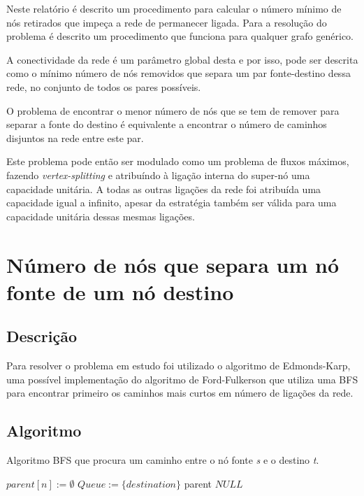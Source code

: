 \documentclass[12pt,a4paper]{scrartcl}
\begin{document}
Neste relatório é descrito um procedimento para calcular o número mínimo de nós retirados que impeça a rede de permanecer ligada. Para a resolução do problema é descrito um procedimento que funciona para qualquer grafo genérico.

A conectividade da rede é um parâmetro global desta e por isso, pode ser descrita como o mínimo número de nós removidos que separa um par fonte-destino dessa rede, no conjunto de todos os pares possíveis.

O problema de encontrar o menor número de nós que se tem de remover para separar a fonte do destino é equivalente a encontrar o número de caminhos disjuntos na rede entre este par.

Este problema pode então ser modulado como um problema de fluxos máximos, fazendo \textit{vertex-splitting} e atribuíndo à ligação interna do super-nó uma capacidade unitária. A todas as outras ligações da rede foi atribuída uma capacidade igual a infinito, apesar da estratégia também ser válida para uma capacidade unitária dessas mesmas ligações.

\section{Número de nós que separa um nó fonte de um nó destino}

\subsection{Descrição}
Para resolver o problema em estudo foi utilizado o algoritmo de Edmonds-Karp, uma possível implementação do algoritmo de Ford-Fulkerson que utiliza uma BFS para encontrar primeiro os caminhos mais curtos em número de ligações da rede.

\subsection{Algoritmo}

\begin{algorithm}
\caption{Algoritmo BFS que procura um caminho entre o nó fonte \textit{s} e o destino \textit{t}.}\label{alg:bfs_goal}
\begin{algorithmic}[1]
    	\State $parent[n] := \emptyset $
    \EndFor
    \State $Queue :=  \{destination\}$
      		\Return parent 
      \EndIf
            \EndIf
      \EndFor
  	\EndWhile
  	\Return $NULL$
\EndProcedure
\end{algorithmic}
\end{algorithm}
\end{document}
